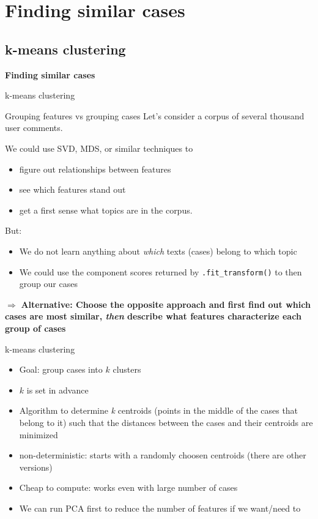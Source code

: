 \documentclass[compress]{beamer}
\begin{document}
\section{Finding similar cases}

\subsection{k-means clustering}

\begin{frame}[plain]
\textbf{Finding similar cases}

k-means clustering
\end{frame}




\begin{frame}{Grouping features vs grouping cases}
Let's consider a corpus of several thousand user comments.

We could use SVD, MDS, or similar techniques to 
\begin{itemize}
\item figure out relationships between features
\item see which features stand out
\item get a first sense what topics are in the corpus.
\end{itemize}
\pause

But:
\begin{itemize}
\item<+-> We do not learn anything about \emph{which} texts (cases) belong to which topic
\item<+-> We could use the component scores returned by \texttt{.fit\_transform()} to then group our cases
\end{itemize}

\pause 
$\Rightarrow$ \textbf{Alternative: Choose the opposite approach and first find out which cases are most similar, \textit{then} describe what features characterize each group of cases}


\end{frame}




\begin{frame}{k-means clustering}
\begin{itemize}[<+->]
\item Goal: group cases into $k$ clusters
\item $k$ is set in advance
\item Algorithm to determine \textit{k} centroids (points in the middle of the cases that belong to it) such that the distances between the cases and their centroids are minimized
\item non-deterministic: starts with a randomly choosen centroids (there are other versions)
\item Cheap to compute: works even with large number of cases
\item We can run PCA first to reduce the number of features if we want/need to
\end{itemize}
\end{frame}
\end{document}
